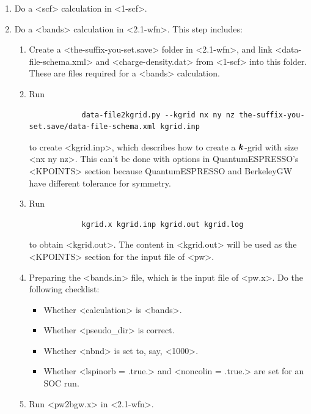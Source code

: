 \documentclass[hyperref, a4paper, 12pt]{report}
\def\texttt#1{<#1>}%
\newcommand{\shortcode}[1]{\texttt{#1}}
\begin{document}
\begin{enumerate}
    \item Do a \shortcode{scf} calculation in \shortcode{1-scf}.
    \item Do a \shortcode{bands} calculation in \shortcode{2.1-wfn}. This step includes: 
    \begin{enumerate}
        \item Create a \shortcode{the-suffix-you-set.save} folder in \shortcode{2.1-wfn},
        and link \shortcode{data-file-schema.xml} and \shortcode{charge-density.dat} 
        from \shortcode{1-scf}
        into this folder.
        These are files required for a \shortcode{bands} calculation.
        \item Run  
        \begin{lstlisting}
            data-file2kgrid.py --kgrid nx ny nz the-suffix-you-set.save/data-file-schema.xml kgrid.inp
        \end{lstlisting}
        to create \shortcode{kgrid.inp},
        which describes how to create a $\vb*{k}$-grid with size \shortcode{nx ny nz}.
        This can't be done with options in QuantumESPRESSO's \shortcode{KPOINTS} section 
        because QuantumESPRESSO and BerkeleyGW have different tolerance for symmetry.
        \item Run 
        \begin{lstlisting}
            kgrid.x kgrid.inp kgrid.out kgrid.log
        \end{lstlisting}
        to obtain \shortcode{kgrid.out}.
        The content in \shortcode{kgrid.out} will be used as the \shortcode{KPOINTS} section 
        for the input file of \shortcode{pw}.
        \item Preparing the \shortcode{bands.in} file, which is the input file of \shortcode{pw.x}.
        Do the following checklist:
        \begin{itemize}
            \item Whether \shortcode{calculation} is \shortcode{bands}.
            \item Whether \shortcode{pseudo_dir} is correct.
            \item Whether \shortcode{nbnd} is set to, say, \shortcode{1000}.
            \item Whether \shortcode{lspinorb = .true.} and \shortcode{noncolin = .true.} 
            are set for an SOC run.
        \end{itemize}
        \item Run \shortcode{pw2bgw.x} in \shortcode{2.1-wfn}.

\end{enumerate}
\end{enumerate}
\end{document}
